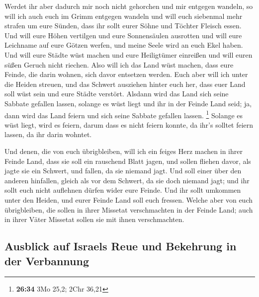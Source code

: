  Werdet ihr aber dadurch mir noch nicht gehorchen und mir
entgegen wandeln,  so will ich auch euch im Grimm
entgegen wandeln und will euch siebenmal mehr strafen um eure Sünden,
 dass ihr sollt eurer Söhne und Töchter Fleisch essen.
 Und will eure Höhen vertilgen und eure Sonnensäulen
ausrotten und will eure Leichname auf eure Götzen werfen, und meine
Seele wird an euch Ekel haben.  Und will eure Städte wüst
machen und eure Heiligtümer einreißen und will euren süßen Geruch nicht
riechen.  Also will ich das Land wüst machen, dass eure
Feinde, die darin wohnen, sich davor entsetzen werden. 
Euch aber will ich unter die Heiden streuen, und das Schwert ausziehen
hinter euch her, dass euer Land soll wüst sein und eure Städte verstört.
 Alsdann wird das Land sich seine Sabbate gefallen
lassen, solange es wüst liegt und ihr in der Feinde Land seid; ja, dann
wird das Land feiern und sich seine Sabbate gefallen lassen. \footnote{\textbf{26:34}
  3Mo 25,2; 2Chr 36,21}  Solange es wüst liegt, wird es
feiern, darum dass es nicht feiern konnte, da ihr's solltet feiern
lassen, da ihr darin wohntet.

 Und denen, die von euch übrigbleiben, will ich ein
feiges Herz machen in ihrer Feinde Land, dass sie soll ein rauschend
Blatt jagen, und sollen fliehen davor, als jagte sie ein Schwert, und
fallen, da sie niemand jagt.  Und soll einer über den
anderen hinfallen, gleich als vor dem Schwert, da sie doch niemand jagt;
und ihr sollt euch nicht auflehnen dürfen wider eure Feinde.
 Und ihr sollt umkommen unter den Heiden, und eurer
Feinde Land soll euch fressen.  Welche aber von euch
übrigbleiben, die sollen in ihrer Missetat verschmachten in der Feinde
Land; auch in ihrer Väter Missetat sollen sie mit ihnen verschmachten.

\hypertarget{ausblick-auf-israels-reue-und-bekehrung-in-der-verbannung}{%
\subsection{Ausblick auf Israels Reue und Bekehrung in der
Verbannung}\label{ausblick-auf-israels-reue-und-bekehrung-in-der-verbannung}}

